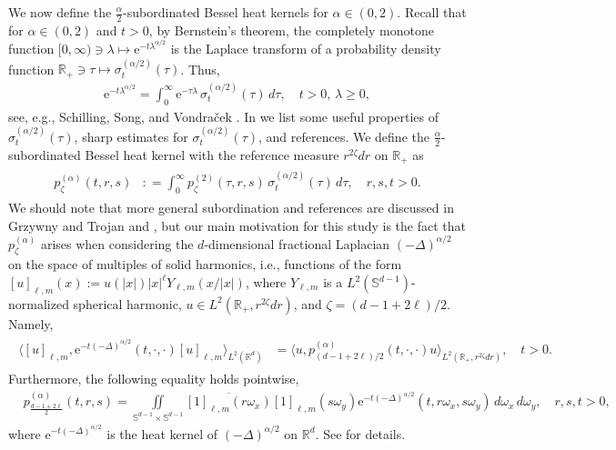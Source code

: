 \documentclass[12pt,reqno,a4paper]{amsart}
\theoremstyle{definition}
\theoremstyle{remark}
\numberwithin{equation}{section}
\newcommand{\1}{\mathbbm{1}}
\newcommand{\R}{\mathbb{R}}
\def\bs{\mathbb{S}}
\newcommand{\me}[1]{\mathrm{e}^{#1}}
\begin{document}
\smallskip
We now define the $\tfrac\alpha2$-subordinated Bessel heat kernels for $\alpha\in(0,2)$. Recall that for $\alpha\in(0,2)$ and $t>0$, by Bernstein's theorem, the completely monotone function $[0,\infty)\ni\lambda\mapsto\me{-t\lambda^{\alpha/2}}$  is the Laplace transform of a probability density function $\R_+\ni\tau\mapsto\sigma_t^{(\alpha/2)}(\tau)$. Thus,
\begin{align}
  \label{eq:subordination}
  \me{-t\lambda^{\alpha/2}} = \int_0^\infty \me{-\tau\lambda}\,\sigma_t^{(\alpha/2)}(\tau)\,d\tau, \quad t>0,\,\lambda\geq0,
\end{align}
see, e.g., Schilling, Song, and Vondra\v{c}ek \cite[(1.4) and Chapter~5]{Schillingetal2012}.
In \cite[Appendix~B]{BogdanMerz2024} we list some useful properties of $\sigma_t^{(\alpha/2)}(\tau)$, sharp estimates for $\sigma_t^{(\alpha/2)}(\tau)$, and references. We define the $\tfrac\alpha2$-subordinated Bessel heat kernel with the reference measure $r^{2\zeta}dr$ on $\R_+$ as
\begin{align}
  \label{eq:defpheatalpha}
  \begin{split}
    p_\zeta^{(\alpha)}(t,r,s) & : = \int_0^\infty p_\zeta^{(2)}(\tau,r,s)\,\sigma_t^{(\alpha/2)}(\tau)\,d\tau, \quad r,s,t>0.
  \end{split}
\end{align}
We should note that more general subordination and references are discussed in Grzywny and Trojan \cite{GrzywnyTrojan2021} and \cite{Schillingetal2012}, but our main motivation for this study is the fact that $p_\zeta^{(\alpha)}$ arises when considering the $d$-dimensional fractional Laplacian $(-\Delta)^{\alpha/2}$ on the space of multiples of solid harmonics, i.e., functions of the form $[u]_{\ell,m}(x):=u(|x|)|x|^\ell Y_{\ell,m}(x/|x|)$, where $Y_{\ell,m}$ is a $L^2(\bs^{d-1})$-normalized spherical harmonic, $u\in L^2(\R_+,r^{2\zeta}dr)$, and $\zeta=(d-1+2\ell)/2$. Namely,
\begin{align}
  \label{eq:linksemigroupsrdrplus}
  \begin{split}
    \langle[u]_{\ell,m},\me{-t(-\Delta)^{\alpha/2}}(t,\cdot,\cdot)[u]_{\ell,m}\rangle_{L^2(\R^d)}
    & = \langle u, p_{(d-1+2\ell)/2}^{(\alpha)}(t,\cdot,\cdot)u\rangle_{L^2(\R_+,r^{2\zeta}dr)},
      \quad t>0.
  \end{split}
\end{align}
Furthermore, the following equality holds pointwise,
\begin{align}
  & p_{\frac{d-1+2\ell}{2}}^{(\alpha)}(t,r,s)
    = \iint\limits_{\bs^{d-1}\times\bs^{d-1}} \overline{[1]_{\ell,m}(r\omega_x)} [1]_{\ell,m}(s\omega_y) \me{-t(-\Delta)^{\alpha/2}}(t,r\omega_x,s\omega_y)\,d\omega_x\,d\omega_y, \quad r,s,t>0,
\end{align}
where $\me{-t(-\Delta)^{\alpha/2}}$ is the heat kernel of $(-\Delta)^{\alpha/2}$ on $\R^d$. See \cite{BogdanMerz2024} for details.
\end{document}
